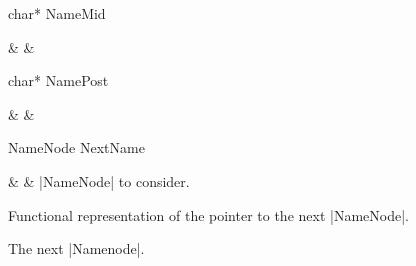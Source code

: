 \begin{Macro}{char* }{NameMid}
  \begin{Arguments}
    &  & \\
  \end{Arguments}%
  
  
  
  \begin{Result}
    
  \end{Result}
\end{Macro}
\begin{Macro}{char* }{NamePost}
  \begin{Arguments}
    &  & \\
  \end{Arguments}%
  
  
  
  \begin{Result}
    
  \end{Result}
\end{Macro}
\begin{Macro}{NameNode }{NextName}
  \begin{Arguments}
    &  & |NameNode| to consider.\\
  \end{Arguments}%
  Functional representation of the pointer to the next
  |NameNode|.
  \begin{Result}
    The next |Namenode|.
  \end{Result}
\end{Macro}



